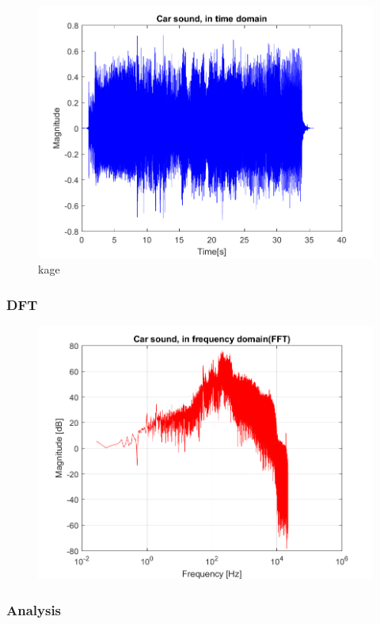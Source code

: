 \begin{figure}
	\includegraphics[width=\textwidth]{code/Car_figure1.png}
	\caption{kage}
	\label{fig:Car_figure1:1}
\end{figure}

\subsubsection{DFT}
\begin{figure}
	\centering
	\includegraphics[width=\textwidth]{code/Car_figure2.png}
	\caption{}
	\label{fig:Car_figure2:2}
\end{figure}




\subsubsection{Analysis}




